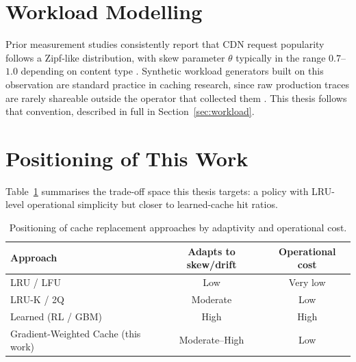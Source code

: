 \section{Workload Modelling}
Prior measurement studies consistently report that CDN request popularity follows a
Zipf-like distribution, with skew parameter $\theta$ typically in the range $0.7$--$1.0$
depending on content type \citep{nimbus2021trafficstudy}. Synthetic workload generators built
on this observation are standard practice in caching research, since raw production traces
are rarely shareable outside the operator that collected them \citep{synapse2022benchmarking}.
This thesis follows that convention, described in full in Section~\ref{sec:workload}.

\section{Positioning of This Work}
Table~\ref{tab:lit-summary} summarises the trade-off space this thesis targets: a policy with
LRU-level operational simplicity but closer to learned-cache hit ratios.

\begin{table}[h]
  \centering
  \caption{Positioning of cache replacement approaches by adaptivity and operational cost.}
  \label{tab:lit-summary}
  \begin{tabular}{@{}lcc@{}}
    \toprule
    \textbf{Approach} & \textbf{Adapts to skew/drift} & \textbf{Operational cost} \\
    \midrule
    LRU / LFU               & Low          & Very low \\
    LRU-K / 2Q               & Moderate     & Low \\
    Learned (RL / GBM)       & High         & High \\
    Gradient-Weighted Cache (this work) & Moderate--High & Low \\
    \bottomrule
  \end{tabular}
\end{table}

